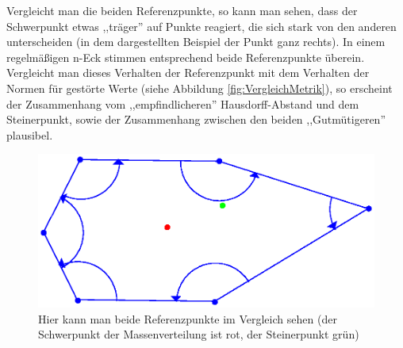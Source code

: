 Vergleicht man die beiden Referenzpunkte, so kann man sehen, dass der Schwerpunkt etwas ,,träger'' auf Punkte reagiert, die sich stark von den anderen unterscheiden (in dem dargestellten Beispiel der Punkt ganz rechts). In einem regelmäßigen n-Eck stimmen entsprechend beide Referenzpunkte überein. Vergleicht man dieses Verhalten der Referenzpunkt mit dem Verhalten der Normen für gestörte Werte (siehe Abbildung \ref{fig:VergleichMetrik}), so erscheint der Zusammenhang vom ,,empfindlicheren'' Hausdorff-Abstand und dem  Steinerpunkt, sowie der Zusammenhang zwischen den beiden ,,Gutmütigeren'' plausibel.

\begin{figure}
	\centering
	\includegraphics[scale=.8]{Referenzpunkte.eps}
	\caption[Vergleich beider Referenzpunkte]{Hier kann man beide Referenzpunkte im Vergleich sehen (der Schwerpunkt der Massenverteilung ist rot, der Steinerpunkt grün) }
	\label{fig:Referenzpunkte}
\end{figure}


